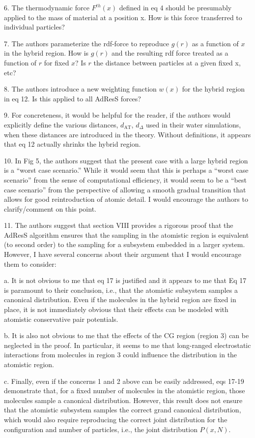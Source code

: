 \documentclass[a4paper]{article}
\begin{document}
6. The thermodynamic force $F^{th}(x)$ defined in eq 4 should be
presumably applied to the mass of material at a position x. How is
this force transferred to individual particles?

7. The authors parameterize the rdf-force to reproduce $g(r)$ as a
function of $x$ in the hybrid region. How is $g(r)$ and the resulting rdf
force treated as a function of $r$ for fixed $x$? Is $r$ the distance
between particles at a given fixed x, etc?

8. The authors introduce a new weighting function $w(x)$ for the hybrid
region in eq 12. Is this applied to all AdResS forces?

9. For concreteness, it would be helpful for the reader, if the
authors would explicitly define the various distances, $d_{\textrm{AT}}$, $d_{\Delta}$
used in their water simulations, when these distances are introduced
in the theory. Without definitions, it appears that eq 12 actually
shrinks the hybrid region.

10.  In Fig 5, the authors suggest that the present case with a large
hybrid region is a “worst case scenario.” While it would seem that
this is perhaps a “worst case scenario” from the sense of
computational efficiency, it would seem to be a “best case scenario”
from the perspective of allowing a smooth gradual transition that
allows for good reintroduction of atomic detail. I would encourage the
authors to clarify/comment on this point.


11. The authors suggest that section VIII provides a rigorous proof
that the AdResS algorithm ensures that the sampling in the atomistic
region is equivalent (to second order) to the sampling for a subsystem
embedded in a larger system. However, I have several concerns about
their argument that I would encourage them to consider:

a. It is not obvious to me that eq 17 is justified and it appears to
me that Eq 17 is paramount to their conclusion, i.e., that the
atomistic subsystem samples a canonical distribution. Even if the
molecules in the hybrid region are fixed in place, it is not
immediately obvious that their effects can be modeled with atomistic
conservative pair potentials.

b. It is also not obvious to me that the effects of the CG region
(region 3) can be neglected in the proof. In particular, it seems to
me that long-ranged electrostatic interactions from molecules in
region 3 could influence the distribution in the atomistic region.

c. Finally, even if the concerns 1 and 2 above can be easily
addressed, eqs 17-19 demonstrate that, for a fixed number of molecules
in the atomistic region, those molecules sample a canonical
distribution. However, this result does not ensure that the atomistic
subsystem samples the correct grand canonical distribution, which
would also require reproducing the correct joint distribution for the
configuration and number of particles, i.e., the joint distribution
$P(x,N)$.
\end{document}
